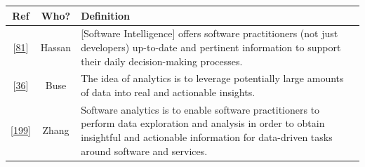 \documentclass[]{book}
\begin{document}
\begin{longtable}[]{@{}ccl@{}}
\toprule
\begin{minipage}[b]{0.07\columnwidth}\centering\strut
Ref\strut
\end{minipage} & \begin{minipage}[b]{0.08\columnwidth}\centering\strut
Who?\strut
\end{minipage} & \begin{minipage}[b]{0.76\columnwidth}\raggedright\strut
Definition\strut
\end{minipage}\tabularnewline
\midrule
\endhead
\begin{minipage}[t]{0.07\columnwidth}\centering\strut
{[}\protect\hyperlink{ref-Hassa10}{81}{]}\strut
\end{minipage} & \begin{minipage}[t]{0.08\columnwidth}\centering\strut
Hassan\strut
\end{minipage} & \begin{minipage}[t]{0.76\columnwidth}\raggedright\strut
{[}Software Intelligence{]} offers software practitioners (not just
developers) up-to-date and pertinent information to support their daily
decision-making processes.\strut
\end{minipage}\tabularnewline
\begin{minipage}[t]{0.07\columnwidth}\centering\strut
{[}\protect\hyperlink{ref-Buse10}{36}{]}\strut
\end{minipage} & \begin{minipage}[t]{0.08\columnwidth}\centering\strut
Buse\strut
\end{minipage} & \begin{minipage}[t]{0.76\columnwidth}\raggedright\strut
The idea of analytics is to leverage potentially large amounts of data
into real and actionable insights.\strut
\end{minipage}\tabularnewline
\begin{minipage}[t]{0.07\columnwidth}\centering\strut
{[}\protect\hyperlink{ref-Zhang11}{199}{]}\strut
\end{minipage} & \begin{minipage}[t]{0.08\columnwidth}\centering\strut
Zhang\strut
\end{minipage} & \begin{minipage}[t]{0.76\columnwidth}\raggedright\strut
Software analytics is to enable software practitioners to perform data
exploration and analysis in order to obtain insightful and actionable
information for data-driven tasks around software and services.\strut

\end{minipage}
\end{longtable}
\end{document}
